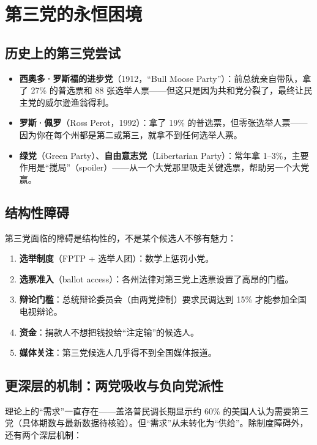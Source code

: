 \documentclass[12pt,a4paper]{ctexart}
\begin{document}
\section{第三党的永恒困境}

\subsection{历史上的第三党尝试}

\begin{itemize}
  \item \textbf{西奥多·罗斯福的进步党}（1912，``Bull Moose Party''）：前总统亲自带队，拿了 27\% 的普选票和 88 张选举人票——但这只是因为共和党分裂了，最终让民主党的威尔逊渔翁得利。
  \item \textbf{罗斯·佩罗}（Ross Perot，1992）：拿了 19\% 的普选票，但零张选举人票——因为你在每个州都是第二或第三，就拿不到任何选举人票。
  \item \textbf{绿党}（Green Party）、\textbf{自由意志党}（Libertarian Party）：常年拿 1--3\%，主要作用是``搅局''（spoiler）——从一个大党那里吸走关键选票，帮助另一个大党赢。
\end{itemize}

\subsection{结构性障碍}

第三党面临的障碍是结构性的，不是某个候选人不够有魅力：

\begin{enumerate}
  \item \textbf{选举制度}（FPTP + 选举人团）：数学上惩罚小党。
  \item \textbf{选票准入}（ballot access）：各州法律对第三党上选票设置了高昂的门槛。
  \item \textbf{辩论门槛}：总统辩论委员会（由两党控制）要求民调达到 15\% 才能参加全国电视辩论。
  \item \textbf{资金}：捐款人不想把钱投给``注定输''的候选人。
  \item \textbf{媒体关注}：第三党候选人几乎得不到全国媒体报道。
\end{enumerate}

\subsection{更深层的机制：两党吸收与负向党派性}

理论上的``需求''一直存在——盖洛普民调长期显示约 60\% 的美国人认为需要第三党（具体期数与最新数据待核验）。但``需求''从未转化为``供给''。除制度障碍外，还有两个深层机制：
\end{document}
